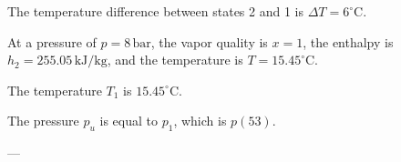The temperature difference between states 2 and 1 is \( \Delta T = 6^\circ\text{C} \).  

At a pressure of \( p = 8 \, \text{bar} \), the vapor quality is \( x = 1 \), the enthalpy is \( h_2 = 255.05 \, \text{kJ/kg} \), and the temperature is \( T = 15.45^\circ\text{C} \).  

The temperature \( T_1 \) is \( 15.45^\circ\text{C} \).  

The pressure \( p_u \) is equal to \( p_1 \), which is \( p(53) \).  

---